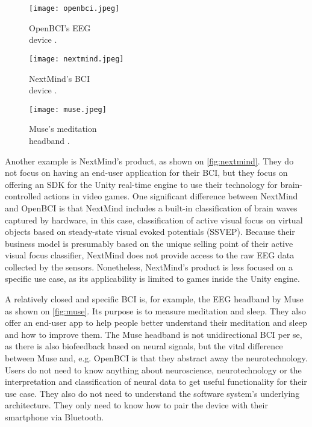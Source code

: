 \begin{figure}[!ht]
  \texttt{[image: openbci.jpeg]}
  \caption{OpenBCI's EEG \\ device \citep{be_superhvman_conor_2017}.}
  \label{fig:openbci}
  \endminipage\hfill
  \texttt{[image: nextmind.jpeg]}
  \caption{NextMind's BCI \\ device \citep{louise_neurotechnology_2019}.}
  \label{fig:nextmind}
  \endminipage\hfill
  \texttt{[image: muse.jpeg]}
  \caption{Muse's meditation \\ headband \citep{muse_muse_nodate}.}
  \label{fig:muse}
  \endminipage
\end{figure}

Another example is NextMind's product, as shown on \autoref{fig:nextmind}. They do not focus on having an end-user application for their BCI, but they focus on offering an SDK for the Unity real-time engine to use their technology for brain-controlled actions in video games. One significant difference between NextMind and OpenBCI is that NextMind includes a built-in classification of brain waves captured by hardware, in this case, classification of active visual focus on virtual objects based on steady-state visual evoked potentials (SSVEP). Because their business model is presumably based on the unique selling point of their active visual focus classifier, NextMind does not provide access to the raw EEG data collected by the sensors. Nonetheless, NextMind's product is less focused on a specific use case, as its applicability is limited to games inside the Unity engine.

A relatively closed and specific BCI is, for example, the EEG headband by Muse as shown on \autoref{fig:muse}. Its purpose is to measure meditation and sleep. They also offer an end-user app to help people better understand their meditation and sleep and how to improve them. The Muse headband is not unidirectional BCI per se, as there is also biofeedback based on neural signals, but the vital difference between Muse and, e.g. OpenBCI is that they abstract away the neurotechnology. Users do not need to know anything about neuroscience, neurotechnology or the interpretation and classification of neural data to get useful functionality for their use case. They also do not need to understand the software system's underlying architecture. They only need to know how to pair the device with their smartphone via Bluetooth.

